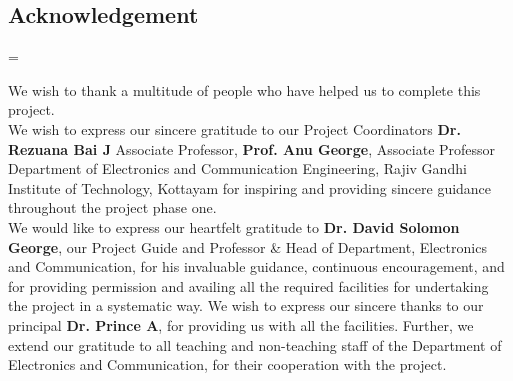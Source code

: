 
\begin{center}

    \vspace{6pt}
    \vspace{20pt}

    \begin{minipage} {0.9\textwidth}

        \chapter*{Acknowledgement}


        \setlength{\parindent}{10pt}
        \setlength{\parskip}{10pt}

        \emergencystretch=\maxdimen

        \noindent We wish to thank a multitude of people who have helped us to
        complete this project.
        \\


        \noindent We wish to express our sincere gratitude to our Project
        Coordinators \textbf{Dr. Rezuana Bai J} Associate Professor,
        \textbf{Prof. Anu George}, Associate Professor Department of
        Electronics and Communication Engineering, Rajiv Gandhi Institute of
        Technology, Kottayam for inspiring and providing sincere guidance
        throughout the project phase one.
        \\


        \noindent We would like to express our heartfelt gratitude to
        \textbf{Dr. David Solomon George}, our Project Guide and Professor \&
        Head of Department, Electronics and Communication, for his invaluable
        guidance, continuous encouragement, and for providing permission and
        availing all the required facilities for undertaking the project in a
        systematic way. We wish to express our sincere thanks to our principal
        \textbf{Dr. Prince A}, for providing us with all the facilities.
        Further, we extend our gratitude to all teaching and non-teaching staff
        of the Department of Electronics and Communication, for their
        cooperation with the project.
        \\



\end{minipage}
\end{center}
